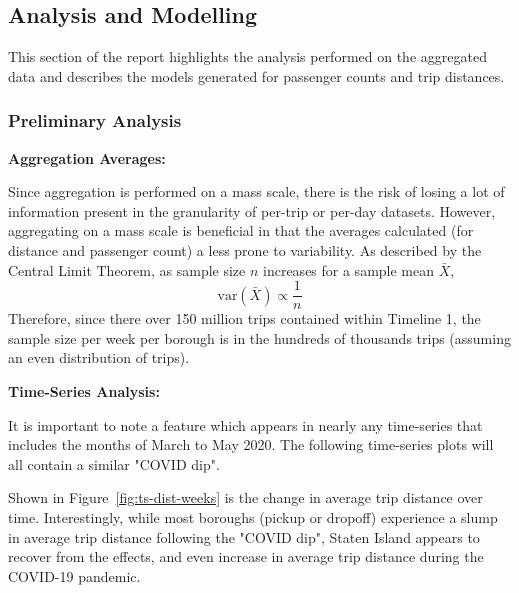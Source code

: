 \documentclass[11pt]{article}
\begin{document}
\subsection{Analysis and Modelling}

This section of the report highlights the analysis performed on the aggregated data
and describes the models generated for passenger counts and trip distances.

\subsubsection{Preliminary Analysis}

\textbf{Aggregation Averages:}

Since aggregation is performed on a mass scale, there is the risk of losing a lot of information present in the granularity of per-trip or per-day datasets.
However, aggregating on a mass scale is beneficial in that the averages calculated (for distance and passenger count)
a less prone to variability. As described by the Central Limit Theorem, as sample size $n$ increases for a sample mean $\bar{X}$,
\begin{equation*}
    \text{var}(\bar{X}) \propto \frac{1}{n}
\end{equation*}
Therefore, since there over 150 million trips contained within Timeline 1, the sample size per week per borough is in the hundreds of thousands trips (assuming an even distribution of trips). 

\textbf{Time-Series Analysis:}

It is important to note 
a feature which appears in nearly any time-series that includes 
the months of March to May 2020. 
The following time-series plots will all contain a similar "COVID dip".

Shown in Figure~\ref{fig:ts-dist-weeks} is the change in average trip distance over time. Interestingly, 
while most boroughs (pickup or dropoff) experience a slump in average trip distance following the "COVID dip", 
Staten Island appears to recover from the effects, and even increase in average trip distance
during the COVID-19 pandemic.
\end{document}
